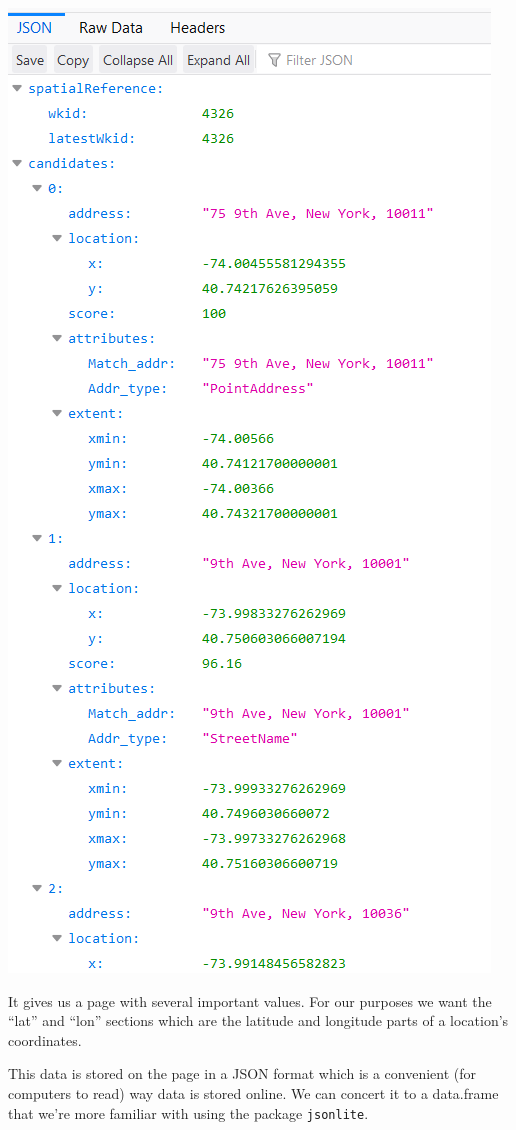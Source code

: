 \documentclass[
  12pt,
]{book}
\begin{document}
\includegraphics{images/geocoding_1.PNG}

It gives us a page with several important values. For our purposes we want the ``lat'' and ``lon'' sections which are the latitude and longitude parts of a location's coordinates.

This data is stored on the page in a JSON format which is a convenient (for computers to read) way data is stored online. We can concert it to a data.frame that we're more familiar with using the package \texttt{jsonlite}.
\end{document}

